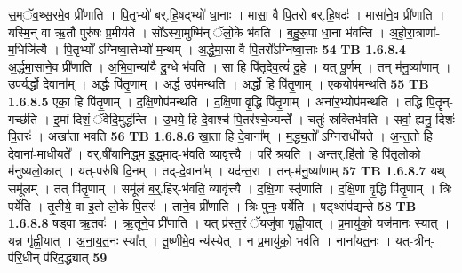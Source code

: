 \documentclass[17pt]{extarticle}
\begin{document}
                  स॒म्ॅव॒थ्स॒रमे॒व प्री॑णाति । पि॒तृभ्यो॑ बर्.हि॒षद्भ्यो॑ धा॒नाः । मासा॒ वै पि॒तरो॑ बर्.हि॒षदः॑ । मासा॑ने॒व प्री॑णाति । यस्मि॒न् वा ऋ॒तौ पुरु॑षः प्र॒मीय॑ते । सो᳚ऽस्या॒मुष्मि॑न् ॅलो॒के भ॑वति । ब॒हु॒रू॒पा धा॒ना भ॑वन्ति । अ॒हो॒रा॒त्राणा॑-म॒भिजि॑त्यै । पि॒तृभ्यो᳚ ऽग्निष्वा॒त्तेभ्यो॑ म॒न्थम् । अ॒र्द्ध॒मा॒सा वै पि॒तरो᳚ऽग्निष्वा॒त्ताः \textbf{ 54} \newline
                  \newline
                                \textbf{ TB 1.6.8.4} \newline
                  अ॒र्द्ध॒मा॒साने॒व प्री॑णाति । अ॒भि॒वा॒न्या॑यै दु॒ग्धे भ॑वति । सा हि पि॑तृदेव॒त्यं॑ दु॒हे । यत् पू॒र्णम् । तन् म॑नु॒ष्या॑णाम् । उ॒प॒र्य॒र्द्धो दे॒वाना᳚म् । अ॒र्द्धः पि॑तृ॒णाम् । अ॒र्द्ध उप॑मन्थति । अ॒र्द्धो हि पि॑तृ॒णाम् । एक॒योप॑मन्थति \textbf{ 55} \newline
                  \newline
                                \textbf{ TB 1.6.8.5} \newline
                  एका॒ हि पि॑तृ॒णाम् । द॒क्षि॒णोप॑मन्थति । द॒क्षि॒णा वृ॒द्धि पि॑तृ॒णाम् । अना॑र॒भ्योप॑मन्थति । तद्धि पि॒तॄन्-गच्छ॑ति । इ॒मां दिशं॒ ॅवेदि॒मुद्ध॑न्ति । उ॒भये॒ हि दे॒वाश्च॑ पि॒तर॑श्चे॒ज्यन्ते᳚ । चतुः॑ स्रक्तिर्भवति । सर्वा॒ ह्यनु॒ दिशः॑ पि॒तरः॑ । अखा॑ता भवति \textbf{ 56} \newline
                  \newline
                                \textbf{ TB 1.6.8.6} \newline
                  खा॒ता हि दे॒वाना᳚म् । म॒द्ध्य॒तो᳚ ऽग्निराधी॑यते । अ॒न्त॒तो हि दे॒वाना॑-माधी॒यते᳚ । वर्.षी॑यानि॒द्ध्म इ॒द्ध्माद्-भ॑वति॒ व्यावृ॑त्त्यै । परि॑ श्रयति । अ॒न्तर्.हि॑तो॒ हि पि॑तृलो॒को म॑नुष्यलो॒कात् । यत्-परु॑षि दि॒नम् । तद्-दे॒वाना᳚म् । यद॑न्त॒रा । तन्-म॑नु॒ष्या॑णाम् \textbf{ 57} \newline
                  \newline
                                \textbf{ TB 1.6.8.7} \newline
                  यथ् समू॑लम् । तत् पि॑तृ॒णाम् । समू॑लं ब॒र्॒.हिर्-भ॑वति॒ व्यावृ॑त्त्यै । द॒क्षि॒णा स्तृ॑णाति । द॒क्षि॒णा वृ॒द्धि पि॑तृ॒णाम् । त्रिः पर्ये॑ति । तृ॒तीये॒ वा इ॒तो लो॒के पि॒तरः॑ । ताने॒व प्री॑णाति । त्रिः पुनः॒ पर्ये॑ति । षट्थ्संप॑द्यन्ते \textbf{ 58} \newline
                  \newline
                                \textbf{ TB 1.6.8.8} \newline
                  षड्वा ऋ॒तवः॑ । ऋ॒तूने॒व प्री॑णाति । यत् प्र॑स्त॒रं ॅयजु॑षा गृह्णी॒यात् । प्र॒मायु॑को॒ यज॑मानः स्यात् । यन्न गृ॑ह्णी॒यात् । अ॒ना॒य॒त॒नः स्या᳚त् । तू॒ष्णीमे॒व न्य॑स्येत् । न प्र॒मायु॑को॒ भव॑ति । नाना॑यत॒नः । यत्-त्रीन्-प॑रि॒धीन् प॑रिद॒द्ध्यात् \textbf{ 59} \newline
\end{document}
